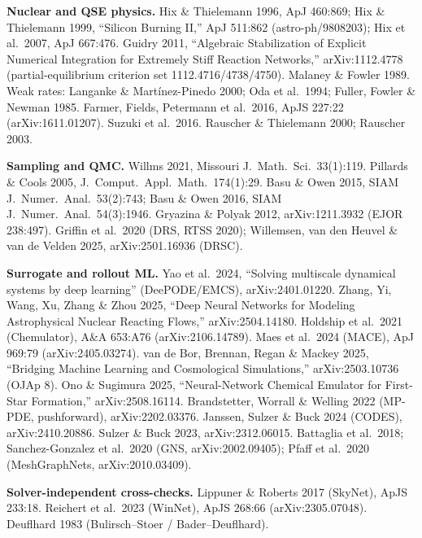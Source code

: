 \documentclass[11pt]{article}
\begin{document}
\textbf{Nuclear and QSE physics.} Hix \& Thielemann 1996, ApJ 460:869; Hix \& Thielemann 1999, ``Silicon Burning II,'' ApJ 511:862 (astro-ph/9808203); Hix et al.\ 2007, ApJ 667:476. Guidry 2011, ``Algebraic Stabilization of Explicit Numerical Integration for Extremely Stiff Reaction Networks,'' arXiv:1112.4778 (partial-equilibrium criterion set 1112.4716/4738/4750). Malaney \& Fowler 1989. Weak rates: Langanke \& Mart\'inez-Pinedo 2000; Oda et al.\ 1994; Fuller, Fowler \& Newman 1985. Farmer, Fields, Petermann et al.\ 2016, ApJS 227:22 (arXiv:1611.01207). Suzuki et al.\ 2016. Rauscher \& Thielemann 2000; Rauscher 2003.

\textbf{Sampling and QMC.} Willms 2021, Missouri J.\ Math.\ Sci.\ 33(1):119. Pillards \& Cools 2005, J.\ Comput.\ Appl.\ Math.\ 174(1):29. Basu \& Owen 2015, SIAM J.\ Numer.\ Anal.\ 53(2):743; Basu \& Owen 2016, SIAM J.\ Numer.\ Anal.\ 54(3):1946. Gryazina \& Polyak 2012, arXiv:1211.3932 (EJOR 238:497). Griffin et al.\ 2020 (DRS, RTSS 2020); Willemsen, van den Heuvel \& van de Velden 2025, arXiv:2501.16936 (DRSC).

\textbf{Surrogate and rollout ML.} Yao et al.\ 2024, ``Solving multiscale dynamical systems by deep learning'' (DeePODE/EMCS), arXiv:2401.01220. Zhang, Yi, Wang, Xu, Zhang \& Zhou 2025, ``Deep Neural Networks for Modeling Astrophysical Nuclear Reacting Flows,'' arXiv:2504.14180. Holdship et al.\ 2021 (Chemulator), A\&A 653:A76 (arXiv:2106.14789). Maes et al.\ 2024 (MACE), ApJ 969:79 (arXiv:2405.03274). van de Bor, Brennan, Regan \& Mackey 2025, ``Bridging Machine Learning and Cosmological Simulations,'' arXiv:2503.10736 (OJAp 8). Ono \& Sugimura 2025, ``Neural-Network Chemical Emulator for First-Star Formation,'' arXiv:2508.16114. Brandstetter, Worrall \& Welling 2022 (MP-PDE, pushforward), arXiv:2202.03376. Janssen, Sulzer \& Buck 2024 (CODES), arXiv:2410.20886. Sulzer \& Buck 2023, arXiv:2312.06015. Battaglia et al.\ 2018; Sanchez-Gonzalez et al.\ 2020 (GNS, arXiv:2002.09405); Pfaff et al.\ 2020 (MeshGraphNets, arXiv:2010.03409).

\textbf{Solver-independent cross-checks.} Lippuner \& Roberts 2017 (SkyNet), ApJS 233:18. Reichert et al.\ 2023 (WinNet), ApJS 268:66 (arXiv:2305.07048). Deuflhard 1983 (Bulirsch--Stoer / Bader--Deuflhard).
\end{document}
